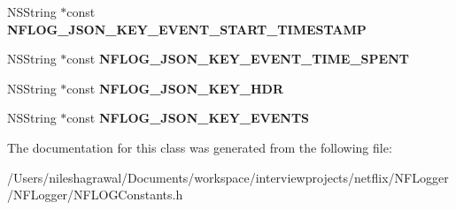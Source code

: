 \begin{DoxyCompactItemize}
N\+S\+String $\ast$const {\bfseries N\+F\+L\+O\+G\+\_\+\+J\+S\+O\+N\+\_\+\+K\+E\+Y\+\_\+\+E\+V\+E\+N\+T\+\_\+\+S\+T\+A\+R\+T\+\_\+\+T\+I\+M\+E\+S\+T\+A\+MP}
\item 
\mbox{\label{interface_n_f_l_o_g_constants_ae55796bd2fb48ae4f3613b7c0a5e9c39}} 
N\+S\+String $\ast$const {\bfseries N\+F\+L\+O\+G\+\_\+\+J\+S\+O\+N\+\_\+\+K\+E\+Y\+\_\+\+E\+V\+E\+N\+T\+\_\+\+T\+I\+M\+E\+\_\+\+S\+P\+E\+NT}
\item 
\mbox{\label{interface_n_f_l_o_g_constants_ae3da9f9edfd0104187fff9818760c6cc}} 
N\+S\+String $\ast$const {\bfseries N\+F\+L\+O\+G\+\_\+\+J\+S\+O\+N\+\_\+\+K\+E\+Y\+\_\+\+H\+DR}
\item 
\mbox{\label{interface_n_f_l_o_g_constants_a73cdd69778ae95dae0dfe9d71aeef532}} 
N\+S\+String $\ast$const {\bfseries N\+F\+L\+O\+G\+\_\+\+J\+S\+O\+N\+\_\+\+K\+E\+Y\+\_\+\+E\+V\+E\+N\+TS}
\end{DoxyCompactItemize}


The documentation for this class was generated from the following file\+:\begin{DoxyCompactItemize}
\item 
/\+Users/nileshagrawal/\+Documents/workspace/interviewprojects/netflix/\+N\+F\+Logger/\+N\+F\+Logger/N\+F\+L\+O\+G\+Constants.\+h\end{DoxyCompactItemize}
